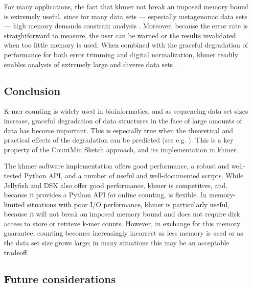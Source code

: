 \documentclass{article}
\begin{document}
For many applications, the fact that khmer not break an imposed
memory bound is extremely useful, since for many data sets ---
especially metagenomic data sets --- high memory demands constrain analysis \cite{Howe2012,GAGE}.  Moreover, because the error
rate is straightforward to measure, the user can be warned or the
results invalidated when too little memory is used.  When combined
with the graceful degradation of performance for both error trimming
and digital normalization, khmer readily enables analysis of extremely
large and diverse data sets \cite{adina2013}.

\subsection{Conclusion}

K-mer counting is widely used in bioinformatics, and as sequencing data set sizes
increase, graceful degradation of data structures in the face of large
amounts of data has become important.  This is especially true when
the theoretical and practical effects of the degradation can be
predicted (see e.g. \cite{Melsted2011, Pell2012, Roy2013}).  This
is a key property of the CountMin Sketch
approach, and its implementation in khmer.

The khmer software implementation offers good performance, a robust
and well-tested Python API, and a number of useful and well-documented
scripts.  While Jellyfish and DSK also offer good performance,
khmer is competitive, and, because it provides a
Python API for online counting, is flexible.  In memory-limited
situations with poor I/O performance, khmer is particularly useful,
because it will not break an imposed memory bound and does not require
disk access to store or retrieve k-mer counts.  However, in exchange
for this memory guarantee, counting becomes increasingly incorrect as
less memory is used or as the data set size grows large; in many
situations this may be an acceptable tradeoff.

\subsection{Future considerations}
\end{document}
